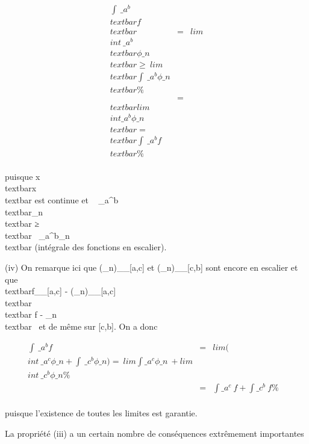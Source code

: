 \documentclass[]{article}
\begin{document}
\begin{align*} \int ~
\_a^b\\textbar{}f\\textbar{}&
=& lim\\int ~
\_a^b\\textbar{}\phi\_
n\\textbar{} ≥\
lim\\textbar{}\int ~
\_a^b\phi\_ n\\textbar{}\%&
\\ & =&
\\textbar{}lim~\\int
 \_a^b\phi\_ n\\textbar{}
=\\textbar{}\int ~
\_a^bf\\textbar{} \%&
\\ \end{align*}

puisque
x\mapsto~\\textbar{}x\\textbar{}
est continue et \int ~
\_a^b\\textbar{}\phi\_n\\textbar{}
≥\\textbar{}\int ~
\_a^b\phi\_n\\textbar{} (intégrale des
fonctions en escalier).

(iv) On remarque ici que
(\phi\_n)\_\textbar{}\_{[}a,c{]} et
(\phi\_n)\_\textbar{}\_{[}c,b{]} sont encore en
escalier et que
\\textbar{}f\_\textbar{}\_{[}a,c{]} -
(\phi\_n)\_\textbar{}\_{[}a,c{]}\\textbar{}\infty~
\leq\\textbar{} f - \phi\_n\\textbar{}\infty~
et de même sur {[}c,b{]}. On a donc

\begin{align*} \int ~
\_a^bf& =&
lim(\\int ~
\_a^c\phi\_ n +\int ~
\_c^b\phi\_ n) =\
lim\int  \_a^c\phi\_ n~
+ lim\\int ~
\_c^b\phi\_ n\%& \\ &
=& \int  \_a^c~f
+\int  \_c^b~f \%&
\\ \end{align*}

puisque l'existence de toutes les limites est garantie.

La propriété (iii) a un certain nombre de conséquences extrêmement
importantes
\end{document}
